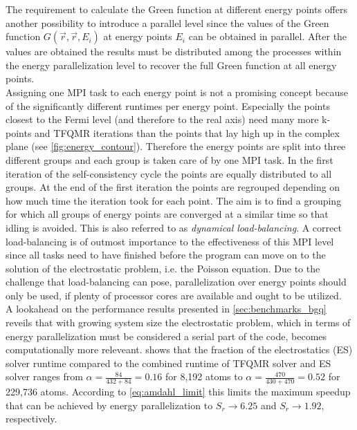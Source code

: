 \documentclass [a4paper, 12pt]{article}
\begin{document}
The requirement to calculate the Green function at different energy points offers another possibility to
introduce a parallel level since the values of the Green function $G(\vec{r},\vec{r},E_i)$ at energy points $E_i$
can be obtained in parallel.
After the values are obtained the results must be distributed among the processes within
the energy parallelization level to recover the full Green function at all energy points.
\\
Assigning one MPI task to each energy point is not a promising concept because
of the significantly different runtimes per energy point. Especially the points closest to the
Fermi level (and therefore to the real axis)
need many more k-points and TFQMR iterations than the points that lay high up in the complex plane (see
\cref{fig:energy_contour}).
Therefore the energy points are split into three different groups and each group is taken care of by
one MPI task. In the first iteration of the self-consistency cycle the points are equally distributed to all
groups. At the end of the first iteration the points are regrouped depending on how much time the iteration took
for each point. The aim is to find a grouping for which all groups of energy points are converged at
a similar time so that idling is avoided. This is also referred to as \textit{dynamical load-balancing}.
A correct load-balancing is of outmost importance to the effectiveness of this MPI level since
all tasks need to have finished before the program can move on to the solution of the electrostatic problem,
i.e. the Poisson equation.
Due to the challenge that load-balancing can pose, parallelization over energy points should only be used, 
if plenty of processor cores are available and
ought to be utilized.
\\
A lookahead on the performance results presented in \cref{sec:benchmarks_bgq}
reveils that with growing system size
the electrostatic problem, which in terms of energy parallelization
must be considered a serial part of the code, becomes computationally more releveant.
 shows 
that the fraction of the electrostatics (ES) solver runtime compared to the combined runtime
of TFQMR solver and ES solver
ranges from $\alpha=\frac{84}{432+84}=0.16$ for 8,192 atoms to $\alpha=\frac{470}{430+470}=0.52$ for
229,736 atoms.
According to \cref{eq:amdahl_limit} this limits the maximum speedup that can be achieved
by energy parallelization to $S_{r} \rightarrow 6.25$ and $S_{r} \rightarrow 1.92$, respectively.
\end{document}
